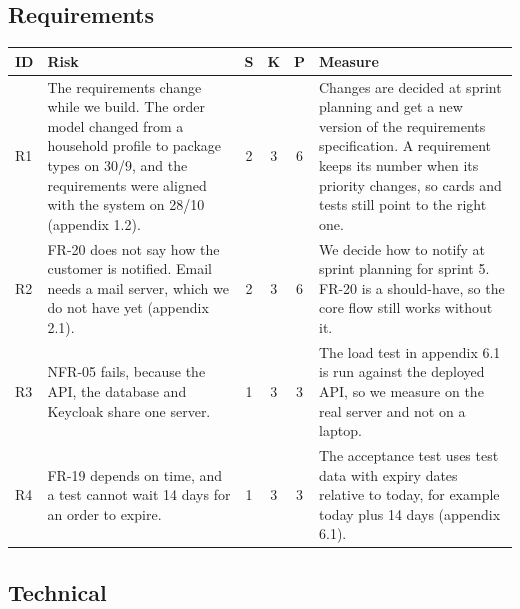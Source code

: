 \documentclass[a4paper,11pt]{article}
\begin{document}
\subsection{Requirements}

\begin{center}
\begin{tabular}{@{}l >{\raggedright\arraybackslash}p{5.2cm} c c c >{\raggedright\arraybackslash}p{6.2cm}@{}}
\textbf{ID} & \textbf{Risk} & \textbf{S} & \textbf{K} & \textbf{P} & \textbf{Measure} \\
\hline
R1 & The requirements change while we build. The order model changed from a household profile to package types on 30/9, and the requirements were aligned with the system on 28/10 (appendix 1.2). & 2 & 3 & 6 & Changes are decided at sprint planning and get a new version of the requirements specification. A requirement keeps its number when its priority changes, so cards and tests still point to the right one. \\
\hline
R2 & FR-20 does not say how the customer is notified. Email needs a mail server, which we do not have yet (appendix 2.1). & 2 & 3 & 6 & We decide how to notify at sprint planning for sprint 5. FR-20 is a should-have, so the core flow still works without it. \\
\hline
R3 & NFR-05 fails, because the API, the database and Keycloak share one server. & 1 & 3 & 3 & The load test in appendix 6.1 is run against the deployed API, so we measure on the real server and not on a laptop. \\
\hline
R4 & FR-19 depends on time, and a test cannot wait 14 days for an order to expire. & 1 & 3 & 3 & The acceptance test uses test data with expiry dates relative to today, for example today plus 14 days (appendix 6.1). \\
\hline
\end{tabular}
\end{center}

\subsection{Technical}
\end{document}
